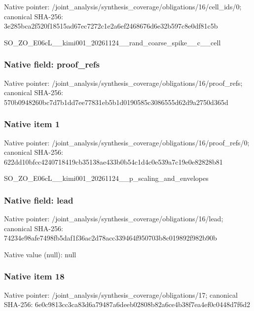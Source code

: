 \documentclass[10pt,a4paper]{article}
\begin{document}
Native pointer: /joint\_analysis/synthesi\allowbreak{}s\_coverage/obligations/1\allowbreak{}6/cell\_ids/0; canonical SHA-256: 3e285bca2f520f18515ad67e\allowbreak{}c7272c1e2a6ef2468676d6e3\allowbreak{}2b597c8e0df81c5b


SO\_ZO\_E06cL\_\_kimi001\_202\allowbreak{}61124\_\_rand\_coarse\_spike\allowbreak{}\_\_c\_\_cell


\subsubsection{Native field: proof\_refs}


Native pointer: /joint\_analysis/synthesi\allowbreak{}s\_coverage/obligations/1\allowbreak{}6/proof\_refs; canonical SHA-256: 570b0948260bc7d7b1dd7ee7\allowbreak{}7831eb5b1d0190585c308655\allowbreak{}5d62d9a2750d365d



\subsubsection{Native item 1}


Native pointer: /joint\_analysis/synthesi\allowbreak{}s\_coverage/obligations/1\allowbreak{}6/proof\_refs/0; canonical SHA-256: 622dd10bfcc4240718419cb3\allowbreak{}5138ae433b0b54c1d4c0e539\allowbreak{}a7c19e0e82828b81


SO\_ZO\_E06cL\_\_kimi001\_202\allowbreak{}61124\_\_p\_scaling\_and\_env\allowbreak{}elopes


\subsubsection{Native field: lead}


Native pointer: /joint\_analysis/synthesi\allowbreak{}s\_coverage/obligations/1\allowbreak{}6/lead; canonical SHA-256: 74234e98afe7498fb5daf1f3\allowbreak{}6ac2d78acc339464f950703b\allowbreak{}8c019892f982b90b



Native value (null): null



\subsubsection{Native item 18}


Native pointer: /joint\_analysis/synthesi\allowbreak{}s\_coverage/obligations/1\allowbreak{}7; canonical SHA-256: 6e0c9813cc3ca83d6a79487a\allowbreak{}6deeb02808b82a6ce4b38f7e\allowbreak{}a4ef0c0448d7f6d2
\end{document}
